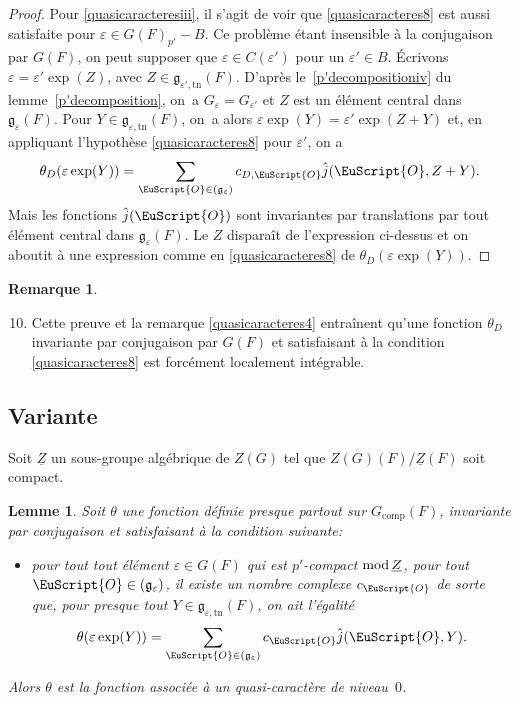 \documentclass[JEP,XML,SOM,Unicode,francais]{cedram}
\let\mathcal \EuScript
\newcommand{\NoChangel}[1]{%
\expandafter\let\csname old\string#1\endcsname=#1
\let#1=\relax
\newcommand{#1}{\mathcode`l="716C\csname old\string#1\endcsname\mathcode`l="7160 }%
}
\let\epsilon\varepsilon
\newcommand{\rmod}{\textup{mod}\,}
\newcommand{\frg}{\mathfrak{g}}
\newcommand{\comp}{\mathrm{comp}}
\newcommand{\Nil}{\mathrm{Nil}} \NoChangel{\Nil}
\newcommand{\tn}{\mathrm{tn}}
\newcommand{\cO}{\mathcal{O}}
\theoremstyle{plain}
\newtheorem*{lem*}{Lemme}
\theoremstyle{definition}
\newtheorem*{rem*}{Remarque}
\begin{document}
\begin{proof}
Pour \eqref{quasicaracteresiii}, il s'agit de voir que \eqref{quasicaracteres8} est aussi satisfaite pour $\epsilon\in G(F)_{p'}-B$. Ce problème étant insensible à la conjugaison par $G(F)$, on peut supposer que $\epsilon\in C(\epsilon')$ pour un $\epsilon'\in B$. Écrivons $\epsilon=\epsilon'\exp(Z)$, avec $Z\in \frg_{\epsilon',\tn}(F)$. D'après le~\eqref{p'decompositioniv} du lemme~\ref{p'decomposition}, on~a $G_{\epsilon}=G_{\epsilon'}$ et $Z$ est un élément central dans $\frg_{\epsilon}(F)$. Pour $Y\in \frg_{\epsilon,\tn}(F)$, on~a alors $\epsilon \exp(Y)=\epsilon' \exp(Z+Y)$ et, en appliquant l'hypothèse \eqref{quasicaracteres8} pour $\epsilon'$, on a
\[
\theta_{D}(\epsilon \exp(Y))=\sum_{\cO\in \Nil(\frg_{\epsilon})}c_{D,\cO}\hat{j}(\cO,Z+Y).
\]
Mais les fonctions $\hat{j}(\cO)$ sont invariantes par translations par tout élément central dans $\frg_{\epsilon}(F)$. Le $Z$ disparaît de l'expression ci-dessus et on aboutit à une expression comme en \eqref{quasicaracteres8} de $\theta_{D}(\epsilon \exp(Y))$.
\end{proof}

\skpt
\begin{rem*}
\begin{enumerate}\setcounter{enumi}{9}
\item
Cette preuve et la remarque \eqref{quasicaracteres4} entraînent qu'une fonction $\theta_{D}$ invariante par conjugaison par $G(F)$ et satisfaisant à la condition \eqref{quasicaracteres8} est forcément localement intégrable.
\end{enumerate}
\end{rem*}

\subsection{Variante}\label{variante1}
Soit $\underline{Z}$ un sous-groupe algébrique de $Z(G)$ tel que $Z(G)(F)/ \underline{Z}(F)$ soit compact.

\begin{lem*}
Soit $\theta$ une fonction définie presque partout sur $G_{\comp}(F)$, invariante par conjugaison et satisfaisant à la condition suivante:
\begin{itemize}
\item
pour tout tout élément $\epsilon\in G(F)$ qui est $p'$-compact $\rmod\underline{Z}$, pour tout $\cO\in \Nil(\frg_{\epsilon})$, il existe un nombre complexe $c_{\cO}$ de sorte que, pour presque tout $Y\in \frg_{\epsilon,\tn}(F)$, on ait l'égalité
\[
\theta(\epsilon \exp(Y))=\sum_{\cO\in \Nil(\frg_{\epsilon})}c_{\cO}\hat{j}(\cO,Y).
\]

\end{itemize}
Alors $\theta$ est la fonction associée à un quasi-caractère de niveau~$0$.
\end{lem*}
\end{document}

